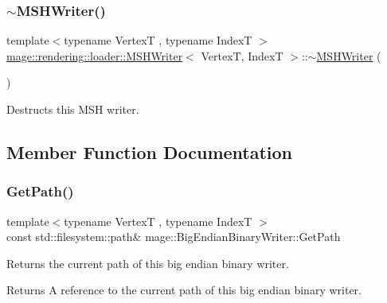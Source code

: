 \subsubsection{\texorpdfstring{$\sim$\+M\+S\+H\+Writer()}{~MSHWriter()}}
{\footnotesize\ttfamily template$<$typename VertexT , typename IndexT $>$ \\
\mbox{\hyperlink{classmage_1_1rendering_1_1loader_1_1_m_s_h_writer}{mage\+::rendering\+::loader\+::\+M\+S\+H\+Writer}}$<$ VertexT, IndexT $>$\+::$\sim$\mbox{\hyperlink{classmage_1_1rendering_1_1loader_1_1_m_s_h_writer}{M\+S\+H\+Writer}} (\begin{DoxyParamCaption}{ }\end{DoxyParamCaption})}

Destructs this M\+SH writer. 

\subsection{Member Function Documentation}
\mbox{\label{classmage_1_1rendering_1_1loader_1_1_m_s_h_writer_a812e65c16bf1b14d396d109eb969eeb8}} 
\subsubsection{\texorpdfstring{Get\+Path()}{GetPath()}}
{\footnotesize\ttfamily template$<$typename VertexT , typename IndexT $>$ \\
const std\+::filesystem\+::path\& mage\+::\+Big\+Endian\+Binary\+Writer\+::\+Get\+Path\hspace{0.3cm}{\ttfamily [noexcept]}}

Returns the current path of this big endian binary writer.

\begin{DoxyReturn}{Returns}
A reference to the current path of this big endian binary writer. 
\end{DoxyReturn}
\mbox{\label{classmage_1_1rendering_1_1loader_1_1_m_s_h_writer_a661eaab96539a7bf08f100095603af0e}} 
